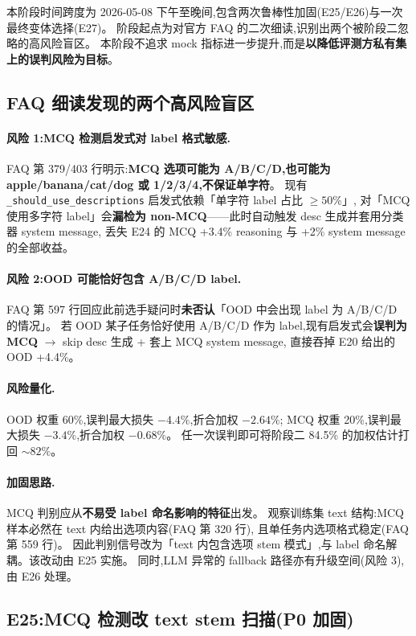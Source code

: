 \documentclass[11pt,a4paper]{ctexart}
\begin{document}
本阶段时间跨度为 2026-05-08 下午至晚间,包含两次鲁棒性加固(E25/E26)与一次最终变体选择(E27)。
阶段起点为对官方 FAQ 的二次细读,识别出两个被阶段二忽略的高风险盲区。
本阶段不追求 mock 指标进一步提升,而是\textbf{以降低评测方私有集上的误判风险为目标}。

\subsection{FAQ 细读发现的两个高风险盲区}

\paragraph{风险 1:MCQ 检测启发式对 label 格式敏感.}
FAQ 第 379/403 行明示:\textbf{MCQ 选项可能为 A/B/C/D,也可能为 apple/banana/cat/dog 或 1/2/3/4,不保证单字符}。
现有 \texttt{\_should\_use\_descriptions} 启发式依赖「单字符 label 占比 $\ge 50\%$」,
对「MCQ 使用多字符 label」会\textbf{漏检为 non-MCQ}——此时自动触发 desc 生成并套用分类器 system message,
丢失 E24 的 MCQ +3.4\% reasoning 与 +2\% system message 的全部收益。

\paragraph{风险 2:OOD 可能恰好包含 A/B/C/D label.}
FAQ 第 597 行回应此前选手疑问时\textbf{未否认}「OOD 中会出现 label 为 A/B/C/D 的情况」。
若 OOD 某子任务恰好使用 A/B/C/D 作为 label,现有启发式会\textbf{误判为 MCQ} $\to$ skip desc 生成 + 套上 MCQ system message,
直接吞掉 E20 给出的 OOD +4.4\%。

\paragraph{风险量化.}OOD 权重 60\%,误判最大损失 $-4.4\%$,折合加权 $-2.64\%$;
MCQ 权重 20\%,误判最大损失 $-3.4\%$,折合加权 $-0.68\%$。
任一次误判即可将阶段二 84.5\% 的加权估计打回 $\sim 82\%$。

\paragraph{加固思路.}MCQ 判别应从\textbf{不易受 label 命名影响的特征}出发。
观察训练集 text 结构:MCQ 样本必然在 text 内给出选项内容(FAQ 第 320 行),
且单任务内选项格式稳定(FAQ 第 559 行)。
因此判别信号改为「text 内包含选项 stem 模式」,与 label 命名解耦。该改动由 E25 实施。
同时,LLM 异常的 fallback 路径亦有升级空间(风险 3),由 E26 处理。

\subsection{E25:MCQ 检测改 text stem 扫描(P0 加固)}
\end{document}

